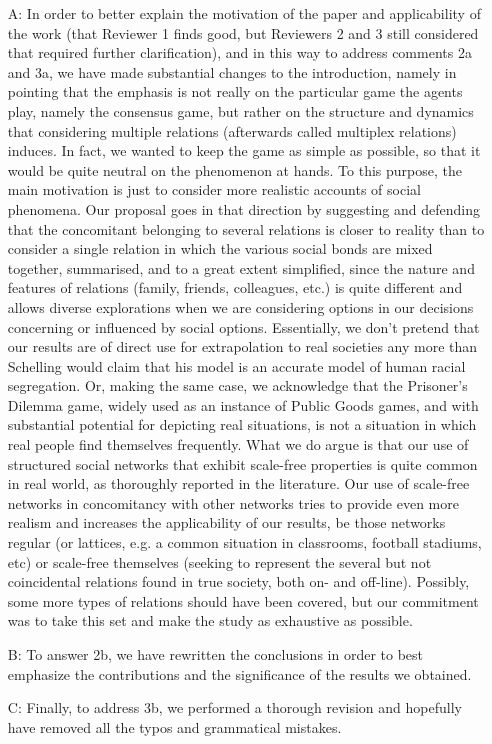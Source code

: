 \documentclass[11pt]{letter}
\begin{document}
\begin{itemize}
\item[A:] In order to better explain the motivation of the paper and applicability of the work (that Reviewer 1 finds good, but Reviewers 2 and 3 still considered that required further clarification), and in this way to address comments 2a and 3a, we have made substantial changes to the introduction, namely in pointing that the emphasis is not really on the particular game the agents play, namely the consensus game, but rather on the structure and dynamics that considering multiple relations (afterwards called multiplex relations) induces. In fact, we wanted to keep the game as simple as possible, so that it would be quite neutral on the phenomenon at hands. To this purpose, the main motivation is just to consider more realistic accounts of social phenomena. Our proposal goes in that direction by suggesting and defending that the concomitant belonging to several relations is closer to reality than to consider a single relation in which the various social bonds are mixed together, summarised, and to a great extent simplified, since the nature and features of relations (family, friends, colleagues, etc.) is quite different and allows diverse explorations when we are considering options in our decisions concerning or influenced by social options. Essentially, we don't pretend that our results are of direct use for extrapolation to real societies any more than Schelling would claim that his model is an accurate model of human racial segregation. Or, making the same case, we acknowledge that the Prisoner's Dilemma game, widely used as an instance of Public Goods games, and with substantial potential for depicting real situations, is not a situation in which real people find themselves frequently. What we do argue is that our use of structured social networks that exhibit scale-free properties is quite common in real world, as thoroughly reported in the literature. Our use of scale-free networks in concomitancy with other networks tries to provide even more realism and increases the applicability of our results, be those networks regular (or lattices, e.g. a common situation in classrooms, football stadiums, etc) or scale-free themselves (seeking to represent the several but not coincidental relations found in true society, both on- and off-line). Possibly, some more types of relations should have been covered, but our commitment was to take this set and make the study as exhaustive as possible.

\item[B:] To answer 2b, we have rewritten the conclusions in order to best emphasize the contributions and the significance of the results we obtained.

\item[C:] Finally, to address 3b, we performed a thorough revision and hopefully have removed all the typos and grammatical mistakes.
\end{itemize}
\end{document}
